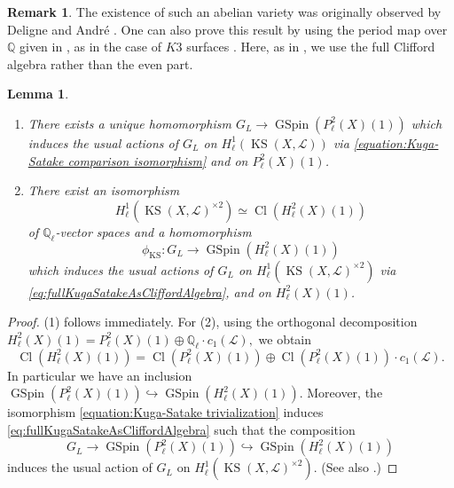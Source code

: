 \documentclass[12pt,reqno]{amsart}
\newtheorem{lem}[thm]{Lemma}
\theoremstyle{definition}
\newtheorem{rem}[thm]{Remark}
\newcommand{\Q}{{\mathds Q}}
\newcommand\Cl{\mathop{\mathrm{Cl}}\nolimits}
\newcommand\GSpin{\mathop{\mathrm{GSpin}}\nolimits}
\newcommand\KS{\mathop{\mathrm{KS}}\nolimits}
\newcommand{\scrL}{\mathscr{L}}
\numberwithin{equation}{section}
\begin{document}
\begin{rem}
The existence of such an abelian variety was originally observed by Deligne \cite{Deligne72} and André \cite{Andre96b}.
    One can also prove this result by using the period map over $\Q$ given in \cite{Bindt}, as in the case of $K3$ surfaces \cite{MadapusiPera}.
    Here, as in \cite{Charles13, MadapusiPera},
    we use 
    the full Clifford algebra rather than the even part.
\end{rem}

\begin{lem}\label{lem:Kuga-Satale for full cohomology}
\begin{enumerate}
    \item There exists a unique homomorphism
    $
    G_L \to \GSpin(P^2_{\ell} (X)(1))
    $
    which induces the usual actions of $G_L$ on $H^1_{\ell}(\KS(X,\scrL))$
    via \eqref{equation:Kuga-Satake comparison isomorphism} and on $P^2_{\ell} (X)(1)$.
\item 
There exist an isomorphism
\begin{equation}\label{eq:fullKugaSatakeAsCliffordAlgebra}
H^1_{\ell} (\KS(X,\scrL)^{\times 2}) \simeq \Cl(H^2_{\ell} (X)(1))
\end{equation}
of $\Q_\ell$-vector spaces
and a homomorphism
\[
\phi_{\KS} \colon G_L \to \GSpin(H^2_{\ell} (X)(1))
\]
which induces the usual actions of $G_L$ on 
$H^1_{\ell} (\KS(X,\scrL)^{\times 2})$
via \eqref{eq:fullKugaSatakeAsCliffordAlgebra}, and on $H^2_{\ell} (X)(1)$.
\end{enumerate}
\end{lem}

\begin{proof}
    (1) follows immediately.
    For (2), using the orthogonal decomposition
    $
    H^2_{\ell} (X)(1) = P^2_{\ell} (X)(1) \oplus \Q_\ell \cdot c_1(\scrL),
    $
    we obtain
    \[
    \Cl(H^2_{\ell} (X)(1)) = \Cl(P^2_{\ell} (X)(1)) \oplus \Cl(P^2_{\ell} (X)(1)) \cdot c_1(\scrL).
    \]
    In particular we have an inclusion
    $\GSpin(P^2_{\ell} (X)(1)) \hookrightarrow \GSpin(H^2_{\ell} (X)(1))$.
    Moreover,
    the isomorphism \eqref{equation:Kuga-Satake trivialization} induces \eqref{eq:fullKugaSatakeAsCliffordAlgebra}
    such that
    the composition
    \[
    G_L\to \GSpin(P^2_{\ell} (X)(1)) \hookrightarrow \GSpin(H^2_{\ell} (X)(1))
    \]
    induces the usual action of $G_L$ on $H^1_{\ell} (\KS(X,\scrL)^{\times 2})$.
    (See also \cite[Variant 4.1.3]{Andre96b}.)
\end{proof}
\end{document}
